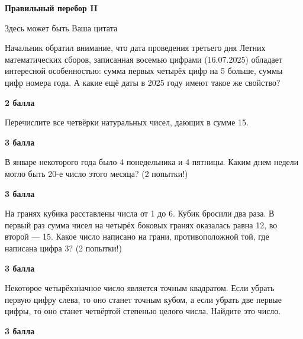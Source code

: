 \centerline{\bf \Huge Правильный перебор II}

\begin{flushright}
        \scriptsize{Здесь может быть Ваша цитата}
\end{flushright}

 Начальник обратил внимание, что дата проведения третьего дня Летних математических сборов, записанная восемью цифрами (16.07.2025) обладает интересной особенностью: сумма первых четырёх цифр на 5 больше, суммы цифр номера года. А какие ещё даты в 2025 году имеют такое же свойство?

\begin{flushright} \textbf{2 балла}\\ 
\end{flushright}

 Перечислите все четвёрки натуральных чисел, дающих в сумме
15.

\begin{flushright} \textbf{3 балла}\\ 
\end{flushright}


 В январе некоторого года было 4 понедельника и 4 пятницы.
Каким днем недели могло быть 20-е число этого месяца? (2 попытки!)



\begin{flushright} \textbf{3 балла}\\ 
\end{flushright}

 На гранях кубика расставлены числа от 1 до 6.
Кубик бросили два раза. В первый раз сумма чисел на четырёх боковых гранях оказалась
равна 12, во второй — 15. Какое число написано на грани, противоположной той, где написана
цифра 3? (2 попытки!)




\begin{flushright} \textbf{3 балла}\\ 
\end{flushright}


  Некоторое четырёхзначное число является точным
квадратом. Если убрать первую цифру слева, то оно станет точным кубом, а если убрать две
первые цифры, то оно станет четвёртой степенью целого числа. Найдите это число.



\begin{flushright} \textbf{3 балла}\\ 
\end{flushright}

